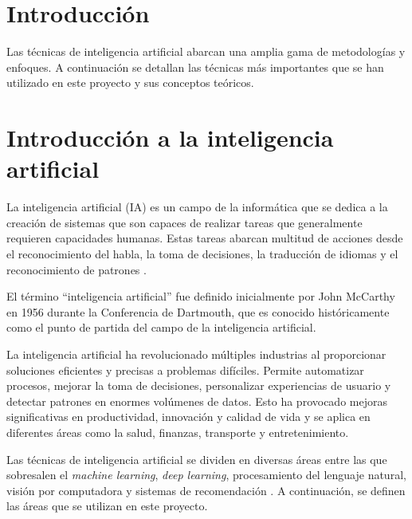 
\section{Introducción}


Las técnicas de inteligencia artificial abarcan una amplia gama de metodologías y enfoques. A continuación se detallan las técnicas más importantes que se han utilizado en este proyecto y sus conceptos teóricos.




\section{Introducción a la inteligencia artificial}

La inteligencia artificial (IA) es un campo de la informática que se dedica a la creación de sistemas que son capaces de realizar tareas que generalmente requieren capacidades humanas. Estas tareas abarcan multitud de acciones desde el reconocimiento del habla, la toma de decisiones, la traducción de idiomas y el reconocimiento de patrones \cite{definicion-ia}.

El término ``inteligencia artificial'' fue definido inicialmente por John McCarthy en 1956 durante la Conferencia de Dartmouth, que es conocido históricamente como el punto de partida del campo de la inteligencia artificial.

La inteligencia artificial ha revolucionado múltiples industrias al proporcionar soluciones eficientes y precisas a problemas difíciles. Permite automatizar procesos, mejorar la toma de decisiones, personalizar experiencias de usuario y detectar patrones en enormes volúmenes de datos. Esto ha provocado mejoras significativas en productividad, innovación y calidad de vida y se aplica en diferentes áreas como la salud, finanzas, transporte y entretenimiento.

Las técnicas de inteligencia artificial se dividen en diversas áreas entre las que sobresalen el \textit{machine learning}, \textit{deep learning}, procesamiento del lenguaje natural, visión por computadora y sistemas de recomendación \cite{tecnicas-ia}. A continuación, se definen las áreas que se utilizan en este proyecto.


